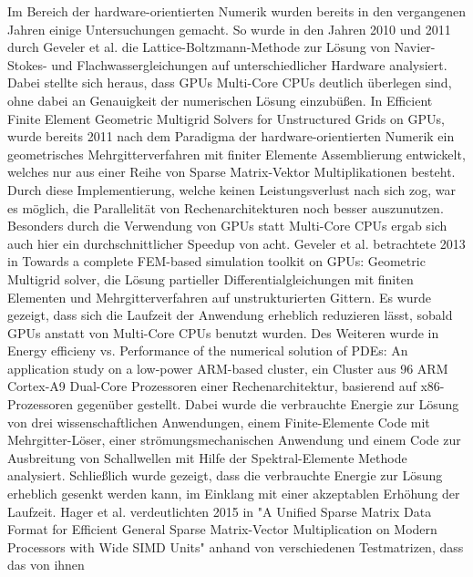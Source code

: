 Im Bereich der hardware-orientierten Numerik wurden bereits in den vergangenen Jahren einige Untersuchungen gemacht. So wurde in den Jahren 2010 und 2011 durch Geveler et al. \cite{GevelerRibbrockMallachGoeddeke2011} die Lattice-Boltzmann-Methode zur Lösung von Navier-Stokes- und Flachwassergleichungen auf unterschiedlicher Hardware analysiert. Dabei stellte sich heraus, dass GPUs Multi-Core CPUs deutlich überlegen sind, ohne dabei an Genauigkeit der numerischen Lösung einzubü\ss en. 
In \glqq Efficient Finite Element Geometric Multigrid Solvers for Unstructured Grids on GPUs\grqq\cite{GevelerRibbrockGoeddekeZajacTurek2011}, wurde bereits 2011 nach dem Paradigma der hardware-orientierten Numerik ein geometrisches Mehrgitterverfahren mit finiter Elemente Assemblierung entwickelt, welches nur aus einer Reihe von Sparse Matrix-Vektor Multiplikationen besteht. Durch diese Implementierung, welche keinen Leistungsverlust nach sich zog, war es möglich, die Parallelität von Rechenarchitekturen noch besser auszunutzen. Besonders durch die Verwendung von GPUs statt Multi-Core CPUs ergab sich auch hier ein durchschnittlicher Speedup von acht.
Geveler et al. betrachtete 2013 in \glqq 
Towards a complete FEM-based simulation toolkit on GPUs: Geometric Multigrid solver\grqq\cite{GevelerRibbrockGoeddekeZajacTurek2011c}, die Lösung partieller Differentialgleichungen mit finiten Elementen und Mehrgitterverfahren auf unstrukturierten Gittern. Es wurde gezeigt, dass sich die Laufzeit der Anwendung erheblich reduzieren lässt, sobald GPUs anstatt von Multi-Core CPUs benutzt wurden. 
Des Weiteren wurde in \glqq Energy efficieny vs. Performance of the numerical solution of PDEs: An application study on a low-power ARM-based cluster\grqq\cite{GoeddekeKomatitschGevelerRibbrockRajovicPuzovicRamirez2013}, ein Cluster aus 96 ARM Cortex-A9 Dual-Core Prozessoren einer Rechenarchitektur, basierend auf x86-Prozessoren gegenüber gestellt. Dabei wurde die verbrauchte Energie zur Lösung von drei wissenschaftlichen Anwendungen, einem Finite-Elemente Code mit Mehrgitter-Löser, einer strömungsmechanischen Anwendung und einem Code zur Ausbreitung von Schallwellen mit Hilfe der Spektral-Elemente Methode analysiert. Schließlich wurde gezeigt, dass die verbrauchte Energie zur Lösung erheblich gesenkt werden kann, im Einklang mit einer akzeptablen Erhöhung der Laufzeit. 
Hager et al. verdeutlichten 2015 in "A Unified Sparse Matrix Data Format for Efficient General Sparse Matrix-Vector Multiplication on Modern Processors with Wide SIMD Units" \cite{doi:10.1137/130930352} anhand von verschiedenen Testmatrizen, dass das von ihnen 



